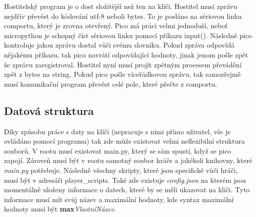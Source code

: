 \documentclass[12pt,a4paper]{article}
\begin{document}
Hostitelský program je o dost složitější než ten na klíči. Hostitel musí zprávu nejdřív převést do kódování utf-8 neboli bytes. To je posláno na sériovou linku comportu, který je zrovna otevřený. Pico má práci velmi jednoduší, neboť micropython je schopný číst sériovou linku pomocí příkazu input(). Následně pico kontroluje jakou zprávu dostal vůči svému slovníku. Pokud zpráva odpovídá nějakému příkazu, tak pico navrátí odpovídající hodnoty, jinak jenom pošle zpět že zprávu zaregistroval. Hostitel nyní musí projít zpětným procesem převádění zpět z bytes na string. Pokud pico pošle víceřádkovou správu, tak samozřejmě musí komunikační program převést celé pole, které přečte z comportu. 

\subsection{Datová struktura}
Díky způsobu práce s daty na klíči (nepracuje s nimi přímo uživatel, vše je ovládáno pomocí programu) tak zde může existovat velmi neflexibilní struktura souborů. V rootu musí existovat main.py, který se sám spustí, když se pico zapojí. Zároveň musí být v rootu samotný soubor hráče a jakékoli knihovny, které \textit{main.py} potřebuje. Následně všechny skripty, které jsou specifické vůči hráči, musí být v adresáři player\_scripts. Také zde existuje \textit{config.json} na kterém jsou momentálně uloženy informace o datech, které by se měli ukazovat na klíči. Tyto informace musí mít svůj název a maximální hodnoty, kde syntax maximální hodnoty musí být \textbf{max}\textit{VlastníNázev}.
\end{document}
